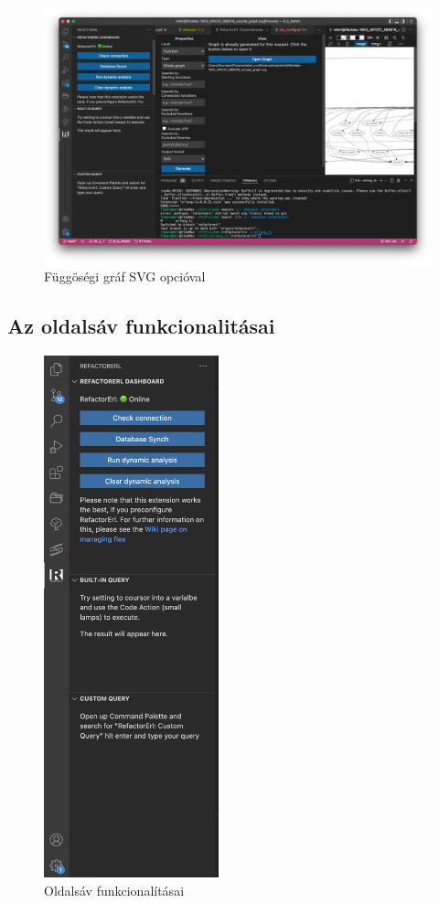 \begin{figure}[H]
  \centering
  \includegraphics[width=\linewidth]{images/svg_graph.png}
  \caption{Függöségi gráf SVG opcióval}
  \label{fig:depGraphSVG}
\end{figure}

\newpage

\subsection{Az oldalsáv funkcionalitásai}

\begin{figure}
\centering
\includegraphics[width=0.45\textwidth]{images/sidebar_active.png}
\caption{\label{fig:sidebar_active} Oldalsáv funkcionalításai}
\end{figure}

